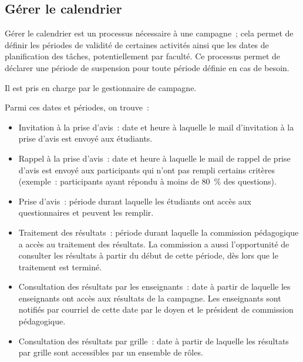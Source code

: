 \documentclass[a4paper,11pt]{report}
\begin{document}
\subsection{Gérer le calendrier}
Gérer le calendrier est un processus nécessaire à une campagne~; cela permet de définir les périodes de validité de certaines activités ainsi que les dates de planification des tâches, potentiellement par faculté.
Ce processus permet de déclarer une période de suspension pour toute période définie en cas de besoin.

\noindent Il est pris en charge par le gestionnaire de campagne.

\noindent Parmi ces dates et périodes, on trouve~:
\begin{itemize}
	\item Invitation à la prise d'avis~: date et heure à laquelle le mail d'invitation à la prise d'avis est envoyé aux étudiants.
	\item Rappel à la prise d'avis~: date et heure à laquelle le mail de rappel de prise d'avis est envoyé aux participants qui n'ont pas rempli certains critères (exemple~: participants ayant répondu à moins de 80~\% des questions).
	\item Prise d'avis~: période durant laquelle les étudiants ont accès aux questionnaires et peuvent les remplir.
	\item Traitement des résultats~: période durant laquelle la commission pédagogique a accès au traitement des résultats. La commission a aussi l'opportunité de consulter les résultats à partir du début de cette période, dès lors que le traitement est terminé.
	\item Consultation des résultats par les enseignants~: date à partir de laquelle les enseignants ont accès aux résultats de la campagne.
	Les enseignants sont notifiés par courriel de cette date par le doyen et le président de commission pédagogique.
	\item Consultation des résultats par grille~: date à partir de laquelle les résultats par grille sont accessibles par un ensemble de rôles.
\end{itemize}
~\newline{}
\end{document}
